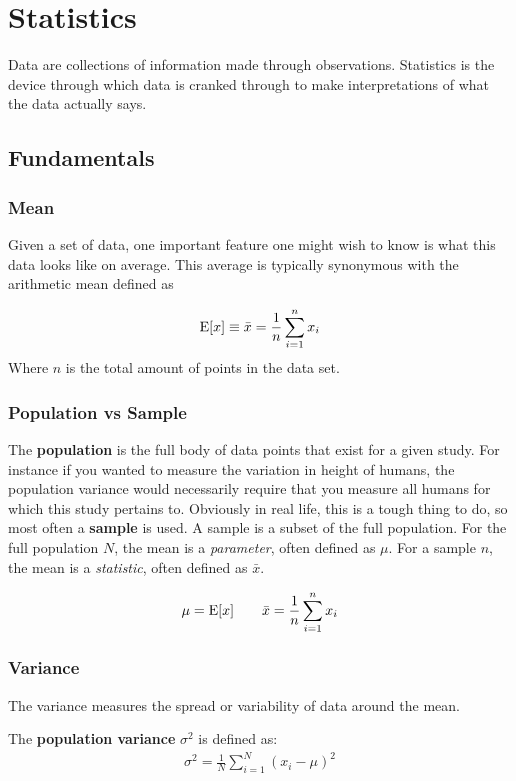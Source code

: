 \chapter{Statistics}
Data are collections of information made through observations. Statistics is the device through which data is cranked through to make interpretations of what the data actually says.

\section{Fundamentals}

\subsection{Mean}
Given a set of data, one important feature one might wish to know is what this data looks like on average. This average is typically synonymous with the arithmetic mean defined as 

\begin{align}
\mathrm{E}[x] \equiv \bar{x} = \frac{1}{n}\sum_{i=1}^n x_i
\end{align}
Where $n$ is the total amount of points in the data set.
\subsection{Population vs Sample}
The \textbf{population} is the full body of data points that exist for a given study. For instance if you wanted to measure the variation in height of humans, 
the population variance would necessarily require that you measure all humans for which this study pertains to. Obviously in real life, this is a tough thing to do, 
so most often a \textbf{sample} is used. A sample is a subset of the full population. For the full population $N$, the mean is a \emph{parameter}, often defined as $\mu$.
For a sample $n$, the mean is a \emph{statistic}, often defined as $\bar{x}$.

\begin{align}
\mu = \mathrm{E}[x] \qquad \bar{x} = \frac{1}{n}\sum_{i=1}^n x_i
\end{align}

\subsection{Variance}
The variance measures the spread or variability of data around the mean.

The \textbf{population variance} $\sigma^2$ is defined as:
\begin{align}
\sigma^2 = \frac{1}{N}\sum_{i=1}^N(x_i - \mu)^2
\end{align}

